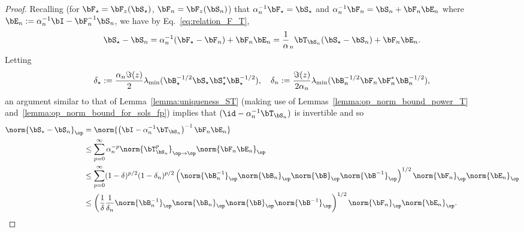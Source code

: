 \begin{proof}
Recalling (for $\bF_{\star} = \bF_z(\bS_{\star})$,
$\bF_{n} = \bF_z(\bS_{n})$) that $\alpha_n^{-1}\bF_\star = \bS_\star$ and 
$\alpha_n^{-1}\bF_n = \bS_n +\bF_n\bE_n$ where $\bE_n := \alpha_n^{-1}\bI - \bF_n^{-1}\bS_n$,
we have by Eq.~\eqref{eq:relation_F_T},
\begin{equation}
    \bS_\star - \bS_n =
    \alpha_n^{-1}(\bF_\star - \bF_n)  + \bF_n\bE_n =
    \frac1\alpha_n \bT_{\bS_n}(\bS_\star -\bS_n) +  \bF_n\bE_n.
\end{equation}
Letting
\begin{equation}
\nonumber
    \delta_\star := \frac{\alpha_n\Im(z)}{2} \lambda_{\min}(\bB_\star^{-1/2} \bS_\star\bS_\star^* \bB_\star^{-1/2}),\quad
    \delta_n := \frac{\Im(z)}{2\alpha_n} \lambda_{\min}(\bB_n^{-1/2} \bF_n\bF_n^* \bB_n^{-1/2}),
\end{equation}
an argument similar to that of Lemma~\ref{lemma:uniqueness_ST} (making use of Lemmas~\ref{lemma:op_norm_bound_power_T} and~\ref{lemma:op_norm_bound_for_sols_fp}) 
implies that $(\id- \alpha_n^{-1}\bT_{\bS_n})$ is invertible and so
\begin{align}
\nonumber
    \norm{\bS_* - \bS_n}_\op 
    &= \norm{\left(\bI - \alpha_n^{-1}\bT_{\bS_n}\right)^{-1} \bF_n \bE_n}\\
\nonumber
    &\le \sum_{p=0}^\infty \alpha_n^{-p}\norm{\bT_{\bS_n}^p}_{\op\to\op} \norm{\bF_n\bE_n}_\op\\
\nonumber
    &\le \sum_{p=0}^\infty (1-\delta)^{p/2}(1-\delta_n)^{p/2} 
    \left(\norm{\bB_n^{-1}}_\op \norm{\bB_n}_\op 
    \norm{\bB}_\op \norm{\bB^{-1}}_\op\right)^{1/2} \norm{\bF_n}_\op\norm{\bE_n}_\op \\
    &\le \left(
    \frac{1}{\delta}
    \frac{1}{\delta_n}
    \norm{\bB_n^{-1}}_\op \norm{\bB_n}_\op 
    \norm{\bB}_\op \norm{\bB^{-1}}_\op
    \right)^{1/2}
    \norm{\bF_n}_\op \norm{\bE_n}_\op.
    \label{eq:S_Sn_rate_expansion}
\end{align}


\end{proof}
